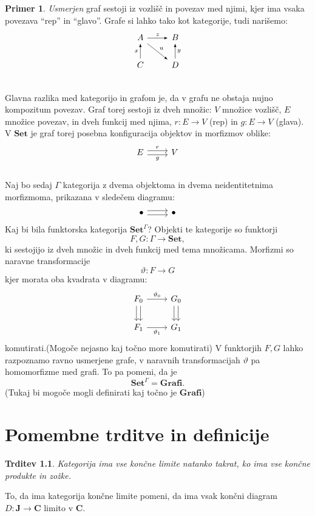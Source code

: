 \documentclass[12pt,a4paper]{book}
\theoremstyle{definition}
\theoremstyle{plain}
\newtheorem{trditev}[definicija]{Trditev}
\theoremstyle{definition}
\newtheorem{primer}{Primer}[section]
\theoremstyle{remark}
\newcommand{\cat}[1]{\textbf{#1}}
\begin{document}
\begin{primer} \label{grafi}
\emph{Usmerjen} graf sestoji iz vozlišč in povezav med njimi, kjer ima vsaka povezava "`rep"' in "`glavo"'. Grafe si lahko tako kot kategorije, tudi narišemo:
%
$$
\begin{tikzcd}[arrow style=tikz, >=latex]
A \ar[r, "z"] \ar[rd, "u"] & B \\
C \ar[u, "x"] & D \ar[u, "y"'] \\
\end{tikzcd}
$$
Glavna razlika med kategorijo in grafom je, da v grafu ne obstaja nujno kompozitum povezav.
Graf torej sestoji iz dveh množic: $V$ množice vozlišč, $E$ množice povezav, in dveh funkcij med njima, $r : E \to V$ (rep) in $g : E \to V$ (glava). V $\cat{Set}$ je graf torej posebna konfiguracija objektov in morfizmov oblike:
%
$$
\begin{tikzcd}
E \ar[r, shift left, "r"] \ar[r, shift right, "g"'] & V \\
\end{tikzcd}
$$
%
Naj bo sedaj $\Gamma$ kategorija z dvema objektoma in dvema neidentitetnima morfizmoma, prikazana v sledečem diagramu:
%
$$
\begin{tikzcd}
\bullet \ar[r, shift left] \ar[r, shift right] & \bullet
\end{tikzcd}
$$
%
Kaj bi bila funktorska kategorija $\cat{Set}^\Gamma$? Objekti te kategorije so funktorji 
$$F,G : \Gamma \to \cat{Set},$$
ki sestojijo iz dveh množic in dveh funkcij med tema množicama. Morfizmi so naravne transformacije
$$\vartheta : F \to G$$
kjer morata oba kvadrata v diagramu:
%
$$
\begin{tikzcd}
F_0 \ar[r, "\vartheta_0"] \ar[d, shift left] \ar[d, shift right] & G_0 \ar[d, shift left] \ar[d, shift right] \\
F_1 \ar[r, "\vartheta_1"'] & G_1
\end{tikzcd}
$$
komutirati.(Mogoče nejasno kaj točno more komutirati)
V funktorjih $F,G$ lahko razpoznamo ravno usmerjene grafe, v naravnih transformacijah $\vartheta$ pa homomorfizme med grafi. To pa pomeni, da je
$$\cat{Set}^\Gamma = \cat{Grafi}.$$
(Tukaj bi mogoče mogli definirati kaj točno je $\cat{Grafi}$)
\end{primer}

\chapter{Pomembne trditve in definicije}


\begin{trditev} \label{konstrukcija limit}
Kategorija ima vse končne limite natanko takrat, ko ima vse končne produkte in zožke.
\end{trditev}
To, da ima kategorija končne limite pomeni, da ima vsak končni diagram $D : \cat{J} \to \cat{C}$ limito v $\cat{C}$.
\end{document}
